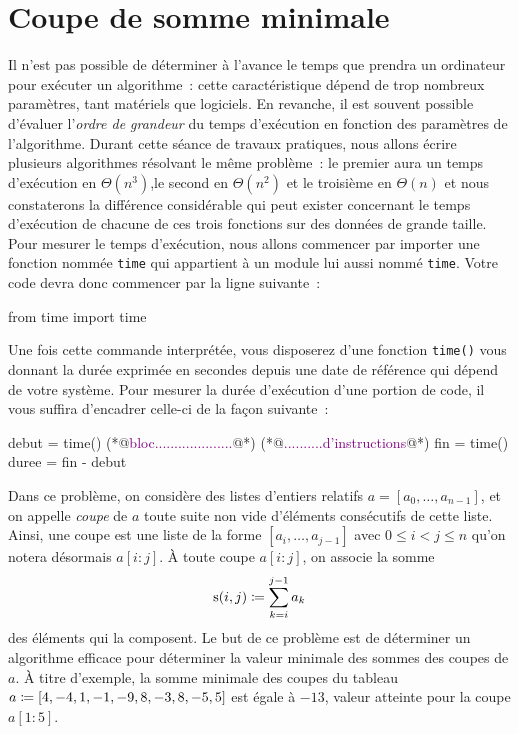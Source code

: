 \documentclass{magnolia}
\begin{document}



\section{Coupe de somme minimale}

Il n'est pas possible de déterminer à l'avance le temps que prendra un ordinateur pour exécuter un algorithme~:
cette caractéristique dépend de trop nombreux paramètres, tant matériels que logiciels. En revanche, il est
souvent possible d'évaluer l'\emph{ordre de grandeur} du temps d'exécution en fonction des paramètres de
l'algorithme. Durant cette séance de travaux pratiques, nous allons écrire plusieurs algorithmes résolvant le
même problème~: le premier aura un temps d'exécution en $\Theta(n^3)$,le second en $\Theta(n^2)$ et le troisième
en $\Theta(n)$ et nous constaterons la différence considérable qui peut exister concernant le temps d'exécution
de chacune de ces trois fonctions sur des données de grande taille.\\

Pour mesurer le temps d'exécution, nous allons commencer par importer une fonction nommée \verb!time! qui
appartient à un module lui aussi nommé \verb!time!. Votre code devra donc commencer par la ligne suivante~:
\begin{pythoncode}
from time import time
\end{pythoncode}
Une fois cette commande interprétée, vous disposerez d'une fonction \verb!time()! vous donnant la durée exprimée
en secondes depuis une date de référence qui dépend de votre système. Pour mesurer la durée d'exécution d'une
portion de code, il vous suffira d'encadrer celle-ci de la façon suivante~:
\begin{pythoncode}
debut = time()
(*@\textcolor{purple}{bloc....................}@*)
(*@\textcolor{purple}{..........d'instructions}@*)
fin = time()
duree = fin - debut
\end{pythoncode}

Dans ce problème, on considère des listes d'entiers relatifs $a=[a_0,\ldots,a_{n-1}]$, et on appelle \emph{coupe}
de $a$ toute suite non vide d'éléments consécutifs de cette liste. Ainsi, une coupe est une liste de la forme
$[a_i,\ldots,a_{j-1}]$ avec $0\leq i<j\leq n$ qu'on notera désormais $a[i:j]$. À toute coupe $a[i:j]$, on associe
la somme
\[{\rm s}(i,j)\coloneqq\sum_{k=i}^{j-1} a_k\]
des éléments qui la composent. Le but de ce problème est de déterminer un algorithme efficace pour déterminer
la valeur minimale des sommes des coupes de $a$. À titre d'exemple, la somme minimale des coupes du tableau
$a\coloneqq[4, -4, 1, -1, -9, 8, -3, 8, -5, 5]$ est égale à $-13$, valeur atteinte pour la coupe $a[1:5]$.
\end{document}
